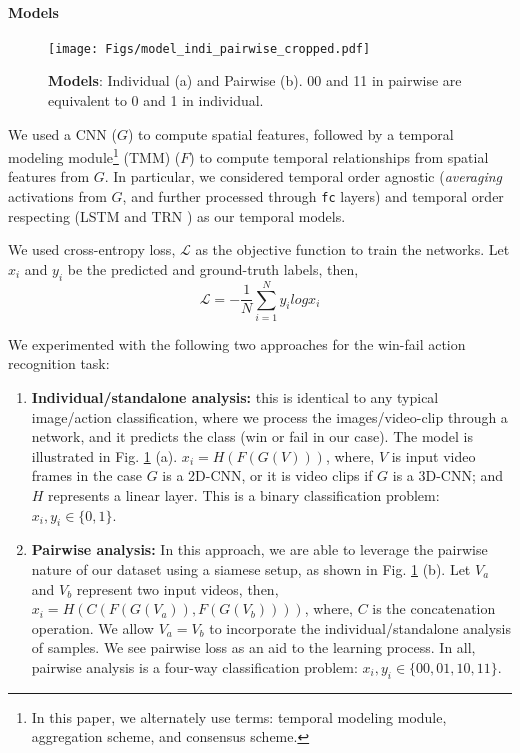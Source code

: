 \documentclass[final]{cvpr}
\begin{document}
\paragraph{Models}
\begin{figure}
    \centering
    \texttt{[image: Figs/model\_indi\_pairwise\_cropped.pdf]}
    \caption{\textbf{Models}: Individual (a) and Pairwise (b). 00 and 11 in pairwise are equivalent to 0 and 1 in individual.}
    \label{fig:models_indi_pair}
\end{figure}
We used a CNN ($G$) to compute spatial features, followed by a temporal modeling module\footnote{In this paper, we alternately use terms: temporal modeling module, aggregation scheme, and consensus scheme.} (TMM) ($F$) to compute temporal relationships from spatial features from $G$. In particular, we considered temporal order agnostic (\textit{averaging} activations from $G$, and further processed through \texttt{fc} layers) and temporal order respecting (LSTM \cite{lstm} and TRN \cite{trn}) as our temporal models. 

We used cross-entropy loss, $\mathcal{L}$ as the objective function to train the networks. Let $x_{i}$ and $y_{i}$ be the predicted and ground-truth labels, then,
\begin{equation}
\label{eq:xentropy_loss}
 \mathcal{L} = -\frac{1}{N} \sum_{i=1}^{N} y_{i}logx_{i}
\end{equation}

We experimented with the following two approaches for the win-fail action recognition task:
\begin{enumerate}
\item{\textbf{Individual/standalone analysis:}} this is identical to any typical image/action classification, where we process the images/video-clip through a network, and it predicts the class (win or fail in our case). The model is illustrated in Fig. \ref{fig:models_indi_pair} (a). $x_{i} = H(F(G(V)))$, where, $V$ is input video frames in the case $G$ is a 2D-CNN, or it is video clips if $G$ is a 3D-CNN; and $H$ represents a linear layer. This is a binary classification problem: $x_{i}, y_{i} \in \{0, 1\}$.
\item{\textbf{Pairwise analysis:}} In this approach, we are able to leverage the pairwise nature of our dataset using a siamese setup, as shown in Fig. \ref{fig:models_indi_pair} (b). Let $V_{a}$ and $V_{b}$ represent two input videos, then, $x_{i} = H(C(F(G(V_{a})), F(G(V_{b}))))$, where, $C$ is the concatenation operation. We allow $V_{a} = V_{b}$ to incorporate the individual/standalone analysis of samples. We see pairwise loss as an aid to the learning process. In all, pairwise analysis is a four-way classification problem: $x_{i}, y_{i} \in \{00, 01, 10, 11\}$.
\end{enumerate}
\end{document}
